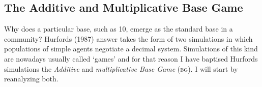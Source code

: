 \documentclass{../src/bcthesispart}
\begin{document}
%



\subsection{The Additive and Multiplicative Base Game}
Why does a particular base, such as 10, emerge as the standard base in a community? 
Hurfords (1987) answer takes the form of two simulations in which populations of simple agents negotiate a decimal system.
Simulations of this kind are nowadays usually called ‘games’ and for that reason I have baptised Hurfords simulations the \emph{Additive} and \emph{multiplicative Base Game} (\textsc{bg}).
I will start by reanalyzing both.
\end{document}
